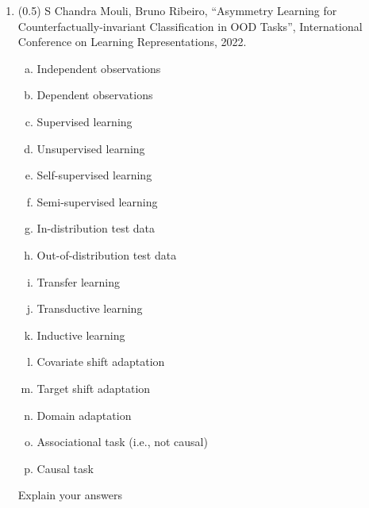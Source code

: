 \documentclass{article}
\begin{document}
\begin{enumerate}
\newpage

\item (0.5) S Chandra Mouli, Bruno Ribeiro, ``Asymmetry Learning for Counterfactually-invariant Classification in OOD Tasks'', International Conference on Learning Representations, 2022. 
\begin{enumerate}[(a)]
\item Independent observations
\item Dependent observations
\item Supervised learning
\item Unsupervised learning
\item Self-supervised learning
\item Semi-supervised learning
\item In-distribution test data
\item Out-of-distribution test data
\item Transfer learning
\item Transductive learning
\item Inductive  learning
\item Covariate shift adaptation
\item Target shift adaptation
\item Domain adaptation
\item Associational task (i.e., not causal)
\item Causal task
\end{enumerate}
Explain your answers\\
 \underline{\hspace{6in}}\\
 \underline{\hspace{6in}}\\
 \underline{\hspace{6in}}\\
 \underline{\hspace{6in}}\\
 \underline{\hspace{6in}}\\
 \underline{\hspace{6in}}\\
 \underline{\hspace{6in}}\\
 \underline{\hspace{6in}}\\
 \underline{\hspace{6in}}\\
 \underline{\hspace{6in}}\\
 \underline{\hspace{6in}}\\
 \underline{\hspace{6in}}\\
 \underline{\hspace{6in}}\\
 \underline{\hspace{6in}}\\
 \underline{\hspace{6in}}\\

\end{enumerate}
\end{document}
